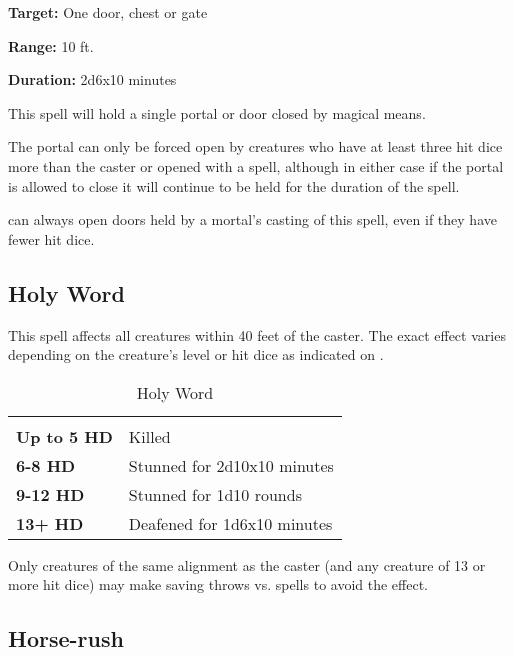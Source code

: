 \begin{multicols*}{2}
{\textbf{Target:} One door, chest or gate

\textbf{Range:} 10 ft.

\textbf{Duration:} 2d6x10 minutes}

This spell will hold a single portal or door closed by magical means.

The portal can only be forced open by creatures who have at least three hit dice more than the caster or opened with a  spell, although in either case if the portal is allowed to close it will continue to be held for the duration of the spell.

 can always open doors held by a mortal’s casting of this spell, even if they have fewer hit dice.

\subsection{Holy Word}\label{spell:Holy Word}

This spell affects all creatures within 40 feet of the caster. The exact effect varies depending on the creature’s level or hit dice as indicated on .

\begin {table}[H]
\caption{Holy Word}\label{tab:Holy Word}
  \begin{tabularx}{\columnwidth}{>{\bfseries}YY}
	 & \\
	Up to 5 HD & Killed\\
	6-8 HD & Stunned for 2d10x10 minutes\\
	9-12 HD & Stunned for 1d10 rounds\\
	13+ HD & Deafened for 1d6x10 minutes
  \end {tabularx}
\end {table}

Only creatures of the same alignment as the caster (and any creature of 13 or more hit dice) may make saving throws vs. spells to avoid the effect.

\subsection{Horse-rush}\label{spell:Horse-rush}
\end{multicols*}
